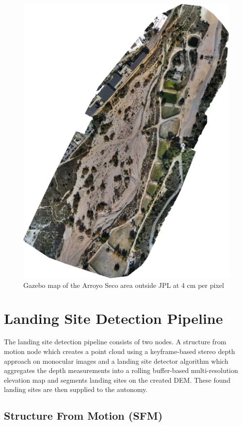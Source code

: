 \documentclass{article}
\begin{document}
\begin{figure}[ht!]
    \centering
    \includegraphics[scale=0.45]{images/evaluation/arroyo.png}
    \caption{Gazebo map of the Arroyo Seco area outside JPL at 4 cm per pixel}
    \label{fig:arroyo_intro}
\end{figure}


\section{Landing Site Detection Pipeline}\label{sec:setup:LSP}

The landing site detection pipeline consists of two nodes. A structure from motion node \citep{SFM} which creates a point cloud using a keyframe-based stereo depth approach on monocular images and a landing site detector algorithm \citep{LSD1, LSD2} which aggregates the depth measurements into a rolling buffer-based multi-resolution elevation map and segments landing sites on the created DEM. These found landing sites are then supplied to the autonomy. 

\subsection{Structure From Motion (SFM)}\label{subsec:setup:SFM}
\end{document}
